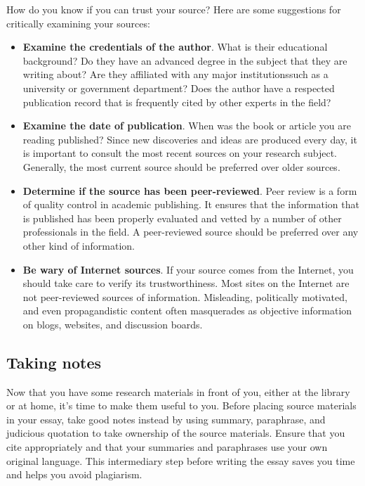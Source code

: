 {How do you know if you can trust your source? Here are some suggestions for 
critically examining your sources:

\begin{itemize}
\item \textbf{Examine the credentials of the author}. What is their educational 
background? Do they have an advanced degree in the subject that they are 
writing about? Are they affiliated with any major institutions\textemdash such 
as a university or government department? Does the author have a respected 
publication record that is frequently cited by other experts in the field?

\item \textbf{Examine the date of publication}. When was the book or article 
you are reading published? Since new discoveries and ideas are produced every 
day, it is important to consult the most recent sources on your research 
subject. Generally, the most current source should be preferred over older 
sources.

\item \textbf{Determine if the source has been peer-reviewed}. Peer review is a 
form of quality control in academic publishing. It ensures that the information 
that is published has been properly evaluated and vetted by a number of other 
professionals in the field. A peer-reviewed source should be preferred over any 
other kind of information.

\item \textbf{Be wary of Internet sources}. If your source comes from the 
Internet, you should take care to verify its trustworthiness. Most sites on the 
Internet are not peer-reviewed sources of information. Misleading, politically 
motivated, and even propagandistic content often masquerades as objective 
information on blogs, websites, and discussion boards. 
\end{itemize}

\subsection{Taking notes}

Now that you have some research materials in front of you, either at the 
library or at home, it's time to make them useful to you. Before placing source 
materials in your essay, take good notes instead by using summary, paraphrase, 
and judicious quotation to take ownership of the source materials. Ensure that 
you cite appropriately and that your summaries and paraphrases use your own 
original language. This intermediary step before writing the essay saves you 
time and helps you avoid plagiarism.

}
